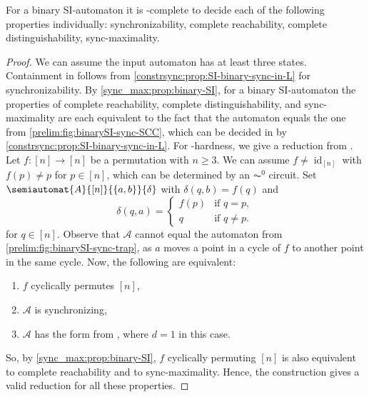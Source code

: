\begin{theorem} \label{syncmax:SI-aut:prop:sync-L-complete}
	For a binary SI-automaton it is \LOGSPACE-complete
	to decide each of the following properties individually: synchronizability,
	complete reachability, complete distinguishability, sync-maximality.	
\end{theorem}
\begin{proof}
	We can assume the input automaton has at least three states.
	Containment in \LOGSPACE
	follows from \cref{constrsync:prop:SI-binary-sync-in-L} 
	for synchronizability.
	By \cref{sync_max:prop:binary-SI}, 
	for a binary SI-automaton
	the properties of complete reachability, complete distinguishability, and sync-maximality
	are each equivalent to the fact that the automaton
	equals the one from \cref{prelim:fig:binarySI-sync-SCC},
	which can be decided in \LOGSPACE 
	by \cref{constrsync:prop:SI-binary-sync-in-L}.
	For \LOGSPACE-hardness, we give a reduction from \SCP. Let $f \colon [n] \to [n]$
	be a permutation with $n \ge 3$.
	We can assume $f \ne \operatorname{id}_{[n]}$
	with $f(p) \ne p$ for $p \in [n]$,
	which can be determined by an $\AC^0$ circuit.
	Set $\semiautomat{A}{[n]}{\{a,b\}}{\delta}$
	with $\delta(q, b) = f(q)$ and
	\[
	\delta(q, a) = \begin{cases}
		f(p) & \text{if } q = p, \\
		q    & \text{if } q \ne p.
	\end{cases}
	\]
	for $q \in [n]$. 
	Observe that $\mathcal A$ cannot equal the automaton from \cref{prelim:fig:binarySI-sync-trap}, as $a$ moves a point in a cycle of $f$
	to another point in the same cycle. Now, the following are equivalent:
	\begin{enumerate}
		\item $f$ cyclically permutes $[n]$,
		
		\item $\mathcal A$ is synchronizing,
		
		\item $\mathcal A$ has the form
		from ,
		where $d = 1$ in this case.		
	\end{enumerate}
	So, by \cref{sync_max:prop:binary-SI},
	$f$ cyclically permuting $[n]$
	is also equivalent to 
	complete
	reachability and to sync-maximality.  
	Hence, the construction gives a valid reduction
	for all these properties.		
\end{proof}
